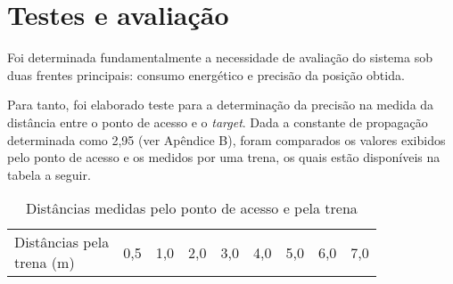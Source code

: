\chapter{Testes e avaliação}

Foi determinada fundamentalmente a necessidade de avaliação do sistema sob duas frentes principais: consumo energético e precisão da posição obtida.

Para tanto, foi elaborado teste para a determinação da precisão na medida da distância entre o ponto de acesso e o \emph{target}. Dada a constante de propagação determinada como 2,95 (ver Apêndice B), foram comparados os valores exibidos pelo ponto de acesso e os medidos por uma trena, os quais estão disponíveis na tabela a seguir.

\begin{table}[ht]
\centering
\caption{Distâncias medidas pelo ponto de acesso e pela trena}
\vspace{0.5cm}
\begin{tabular}{l|cccccccc}
\hline
\makecell{Distâncias pela \\ trena (m)} & 0,5 & 1,0 & 2,0 & 3,0 & 4,0 & 5,0 & 6,0 & 7,0 \vspace{0.4cm}\\


\end{tabular}
\end{table}
